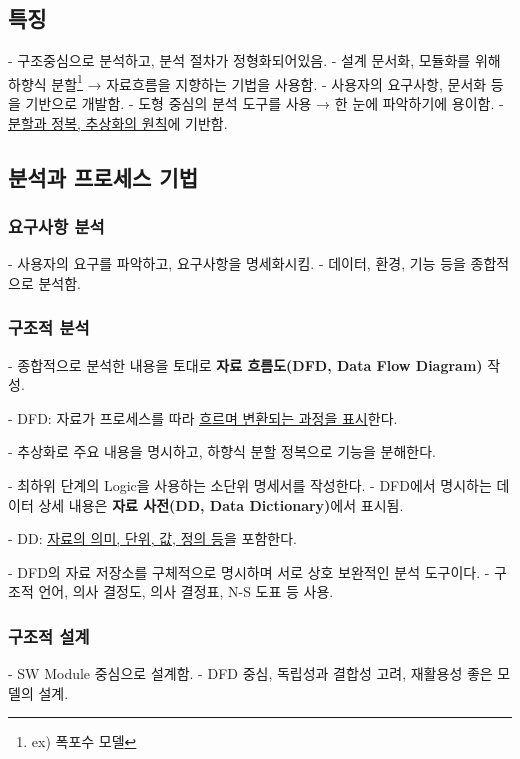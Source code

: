 \documentclass[a4paper,12pt]{article}
\begin{document}
\subsection{특징}
- 구조중심으로 분석하고, 분석 절차가 정형화되어있음.
\newline
- 설계 문서화, 모듈화를 위해 하향식 분할\footnote{ex) 폭포수 모델} → 자료흐름을 지향하는 기법을 사용함.
\newline
- 사용자의 요구사항, 문서화 등을 기반으로 개발함.
\newline
- 도형 중심의 분석 도구를 사용 → 한 눈에 파악하기에 용이함.
\newline
- \underline{분할과 정복, 추상화의 원칙}에 기반함.
\newline

\subsection{분석과 프로세스 기법}
\subsubsection{요구사항 분석}
- 사용자의 요구를 파악하고, 요구사항을 명세화시킴.
\newline
- 데이터, 환경, 기능 등을 종합적으로 분석함.

\subsubsection{구조적 분석}
- 종합적으로 분석한 내용을 토대로 \textbf{자료 흐름도(DFD, Data Flow Diagram)} 작성.

- DFD: 자료가 프로세스를 따라 \underline{흐르며 변환되는 과정을 표시}한다.

- 추상화로 주요 내용을 명시하고, 하향식 분할 정복으로 기능을 분해한다.

- 최하위 단계의 Logic을 사용하는 소단위 명세서를 작성한다.
\newline
- DFD에서 명시하는 데이터 상세 내용은 \textbf{자료 사전(DD, Data Dictionary)}에서 표시됨.

- DD: \underline{자료의 의미, 단위, 값, 정의 등}을 포함한다.

- DFD의 자료 저장소를 구체적으로 명시하며 서로 상호 보완적인 분석 도구이다.
\newline
- 구조적 언어, 의사 결정도, 의사 결정표, N-S 도표 등 사용.

\subsubsection{구조적 설계}
- SW Module 중심으로 설계함.
\newline
- DFD 중심, 독립성과 결합성 고려, 재활용성 좋은 모델의 설계.
\end{document}
